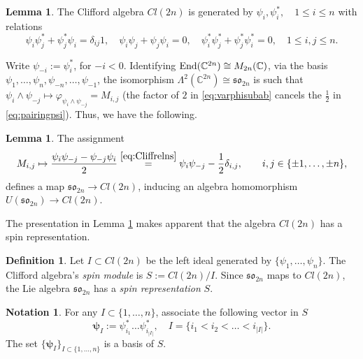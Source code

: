 \documentclass[10pt]{amsart}
\numberwithin{equation}{section}
\theoremstyle{definition}
\newtheorem{lemma}[theorem]{Lemma}
\newtheorem{definition}[theorem]{Definition}
\newtheorem{notation}[theorem]{Notation}
\newcommand{\End}{{\rm End}}
\def\C{{\mathbb C}}
\newcommand{\son}[1][2n]{\mathfrak{so}_{#1}}
\newcommand{\hwp}{\boldsymbol{\psi}}
\begin{document}
\begin{lemma}\label{lem:cliffordgensrelns}
The Clifford algebra $Cl(2n)$ is generated by $\psi_i, \psi_i^{*}, \quad 1\le i\le  n$
with relations
\begin{equation}\label{eq:Cliffrelns}    \psi_i\psi^{*}_j+\psi^{*}_j\psi_i=\delta_{ij}1, \quad \psi_i\psi_j+\psi_j\psi_i=0, \quad \psi_i^{*}\psi_j^{*}+\psi_j^{*}\psi_i^{*}=0, \quad  1\le i,j \le n.
\end{equation}
\end{lemma}

Write $\psi_{-i}:=\psi_i^*$, for $-i< 0$. Identifying $\End(\C^{2n})\cong M_{2n}(\C)$, via the basis $\psi_1, \dots, \psi_n, \psi_{-n}, \dots, \psi_{-1}$, the isomorphism $\Lambda^2(\C^{2n})\cong \son$ is such that $\psi_i\wedge\psi_{-j}\mapsto \varphi_{\psi_i\wedge\psi_{-j}} = M_{i,j}$ (the factor of $2$ in \eqref{eq:varphisubab} cancels the $\frac{1}{2}$ in \eqref{eq:pairingpsi}). Thus, we have the following.

\begin{lemma}\label{lem:so2ntocliff}
The assignment
\[
M_{i,j}\mapsto \frac{\psi_{i}\psi_{-j}-\psi_{-j}\psi_{i}}{2} \stackrel{\eqref{eq:Cliffrelns}}{=} \psi_{i}\psi_{-j} - \frac{1}{2}\delta_{i,j}, \qquad i,j\in \{\pm 1, \dots, \pm n\},
\]
defines a map $\son[2n]\rightarrow Cl(2n)$, inducing an algebra homomorphism $U(\son[2n])\rightarrow Cl(2n)$. 
\end{lemma}

The presentation in Lemma \ref{lem:cliffordgensrelns} makes apparent that the algebra $Cl(2n)$ has a spin representation.

\begin{definition}\label{def:spinmodule}
    Let $I\subset Cl(2n)$ be the left ideal generated by $\{\psi_1, \dots, \psi_n\}$. The Clifford algebra's \emph{spin module} is $S:=Cl(2n)/I$. Since $\son$ maps to $Cl(2n)$, the Lie algebra $\son$ has a \emph{spin representation} $S$.
\end{definition} 

\begin{notation}\label{not:orderedbasisforS}
    For any $I\subset \{1,\dots,n\}$, associate the following vector in $S$
     \begin{equation*}
        \hwp_{I}:= \psi_{i_1}^{*} \dots \psi_{i_{|I|}}^{*}, \quad I=\{i_1<i_2<\dots < i_{|I|}\}.
    \end{equation*}
    The set $\{\hwp_I\}_{I\subset \{1, \dots, n\}}$ is a basis of $S$. 
\end{notation}
\end{document}
